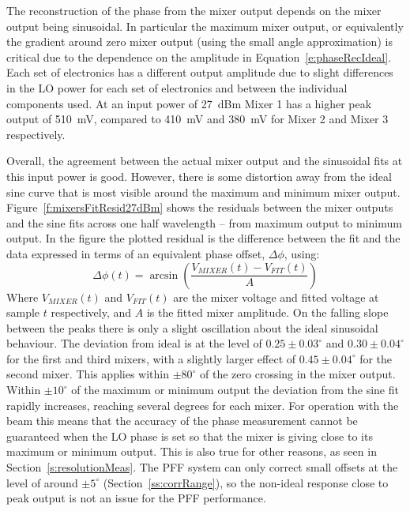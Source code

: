 The reconstruction of the phase from the mixer output depends on the mixer output being sinusoidal. In particular the maximum mixer output, or equivalently the gradient around zero mixer output (using the small angle approximation) is critical due to the dependence on the amplitude in Equation~\ref{e:phaseRecIdeal}. Each set of electronics has a different output amplitude due to slight differences in the LO power for each set of electronics and between the individual components used. At an input power of 27~dBm Mixer 1 has a higher peak output of 510~mV, compared to 410~mV and 380~mV for Mixer 2 and Mixer 3 respectively. 

Overall, the agreement between the actual mixer output and the sinusoidal fits at this input power is good. However, there is some distortion away from the ideal sine curve that is most visible around the maximum and minimum mixer output. Figure~\ref{f:mixersFitResid27dBm} shows the residuals between the mixer outputs and the sine fits across one half wavelength -- from maximum output to minimum output. In the figure the plotted residual is the difference between the fit and the data expressed in terms of an equivalent phase offset, \(\Delta \phi\), using:
\begin{equation}
\Delta \phi(t) = \arcsin\left(\frac{V_{MIXER}(t)-V_{FIT}(t)}{A}\right)
\end{equation}
Where \(V_{MIXER}(t)\) and \(V_{FIT}(t)\) are the mixer voltage and fitted voltage at sample \(t\) respectively, and \(A\) is the fitted mixer amplitude. On the falling slope between the peaks there is only a slight oscillation about the ideal sinusoidal behaviour. The deviation from ideal is at the level of \(0.25\pm0.03^\circ\) and \(0.30\pm0.04^\circ\) for the first and third mixers, with a slightly larger effect of \(0.45\pm0.04^\circ\) for the second mixer. This applies within \(\pm80^\circ\) of the zero crossing in the mixer output. Within \(\pm10^\circ\) of the maximum or minimum output the deviation from the sine fit rapidly increases, reaching several degrees for each mixer. For operation with the beam this means that the accuracy of the phase measurement cannot be guaranteed when the LO phase is set so that the mixer is giving close to its maximum or minimum output. This is also true for other reasons, as seen in Section~\ref{s:resolutionMeas}. The PFF system can only correct small offsets at the level of around \(\pm5^\circ\) (Section~\ref{ss:corrRange}), so the non-ideal response close to peak output is not an issue for the PFF performance.

